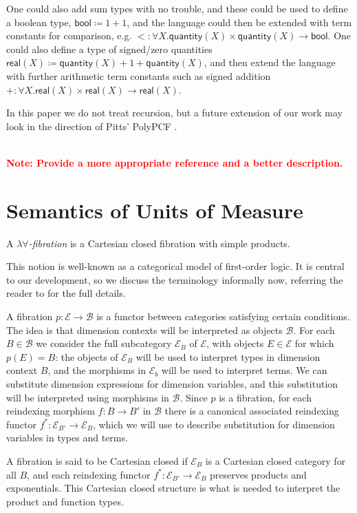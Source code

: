 \documentclass[a4paper,UKenglish]{lipics}
\newcommand\note[1]{{ \bf \textcolor{red} {\vspace{2mm}\; \\ Note: #1\\}}}
\newcommand{\UoM}{Units of Measure\xspace}
\newcommand{\msf}[1]{\mathsf{#1}} %
\newcommand{\B}{\mathcal{B}}
\newcommand{\E}{\mathcal{E}}
\newcommand{\qnt}{\msf{quantity}}
\newcommand{\sreal}{\msf{real}}
\newcommand{\bool}{\msf{bool}}
\newcommand{\Dvar}{X}
\begin{document}
One could also add sum types with no trouble, and these could be used to
define a boolean type,
$\bool\coloneqq 1+1$,
and the language could then be extended with term constants for comparison, e.g.
${<}:\forall \Dvar.\qnt(\Dvar)\times \qnt(\Dvar)\to \bool$.
One could also define a type of signed/zero quantities
$\sreal(\Dvar)\coloneqq \qnt(\Dvar)+1+\qnt(\Dvar)$,
and then extend the language with further arithmetic term constants such as signed addition
$+:\forall \Dvar.\sreal(\Dvar)\times \sreal(\Dvar)\to\sreal(\Dvar)$.

In this paper we do not treat recursion, but a future extension of our work may look in the direction of Pitts' PolyPCF \cite{pitts2000parametric}.

\note{Provide a more appropriate reference and a better description.}





\section{Semantics of \UoM} \label{sec:sem}


\begin{definition}
A \emph{$\lambda\forall$-fibration}
is a Cartesian closed fibration
with simple products.
\end{definition}

This notion is well-known as a categorical model of first-order logic. It is central to our
development, so we discuss the terminology informally now, referring
the reader to \cite{jacobs1999categorical} for the full details.

A fibration $p:\E\to\B$ is a functor between categories satisfying certain conditions.
The idea is that dimension contexts will be interpreted as objects
$\B$. For each $B\in\B$ we consider the full subcategory $\E_B$ of $\E$, with objects $E\in\E$ for which $p(E)=B$:
the objects of $\E_B$ will be used to interpret types in dimension context $B$,
and the morphisms in $\E_b$ will be used to interpret terms.
We can substitute dimension expressions for dimension variables, and this substitution
will be interpreted using morphisms in $\B$.
Since $p$ is a fibration, for each reindexing morphism $f:B\to B'$ in $\B$ there is a
canonical associated reindexing functor $f^*:\E_{B'}\to \E_B$, which we will use
to describe substitution for dimension variables in types and terms.

A fibration is said to be Cartesian closed if $\E_B$ is a Cartesian closed category for all $B$,
and each reindexing functor $f^*:\E_{B'}\to\E_B$ preserves products and exponentials.
This Cartesian closed structure is what is needed to interpret the product and function types.
\end{document}
